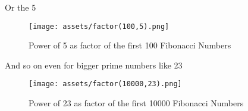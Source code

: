 \documentclass[amsmath,amssymb,aps,pra,reprint,groupedaddress,showpacs]{revtex4-1}
\begin{document}
Or the 5

\begin{figure}[H]
\centering
\texttt{[image: assets/factor(100,5).png]} %
\caption{Power of 5 as factor of the first 100 Fibonacci Numbers}
\end{figure}

And so on even for bigger prime numbers like 23

\begin{figure}[H]
\centering
\texttt{[image: assets/factor(10000,23).png]} %
\caption{Power of 23 as factor of the first 10000 Fibonacci Numbers}
\end{figure}


\begin{comment}

But it's not exactly the same, it seems like the more we increase the base, the less the number appears as a prime factor in Fibonacci Numbers 
(so with an increasing distance between the same exponents), but also this is not true, there are a lot of cases that don't follow the growing rule.

But before getting in a more generic formula, we have to name some things (since they are going to be different for every base).

\begin{enumerate} 
\item $\mathbf{\Gamma}$ will be the base of the prime (or non-prime) number we are taking as example. 
\item $\mathbf{\Omega}$ will be the exponent of base $\Gamma$ of $F(n)$ 
\item $\mathbf{\Delta \Omega}$ will be defined as the distance between the Fibonacci Number before the next equal exponent will appear
\item $\mathbf{F(n)}$ will be the $n_{th}$ Fibonacci Number
\item $\mathbf{\lambda(\Omega, \Gamma)}$ will identify the function that returns the first $n$ where the exponent of the $\Gamma$ base appears in $F(n)$
\item $\mathbf{\lambda_n(\Omega, \Gamma)}$ will, in the same way, be the $n_{th}$ Fibonacci Number where the given exponent for the given base appears
\end{enumerate} 

If we look at FIG. 6 and 7, we have two examples to notice the differences between different bases.
For $\Gamma = 3$ and $\Gamma = 5$ we have $\lambda(1, 3) = 4$ and $\lambda(1, 5) = 6$.
It seems like $\lambda(1, \Gamma) = \Gamma + 1$, but that's wrong: for example, 
for $\Gamma = 11$ we have $\lambda(1, 11) = 10$. For $\Gamma = 13$ it will be $n = 7$. 
So let's have a look at the starting points of the first prime numbers:

\end{comment}
\end{document}
